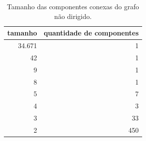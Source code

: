 \begin{table}[htbp]
\centering
\small
\caption{Tamanho das componentes conexas do grafo não dirigido.}
\label{tab:03_tamanho_componentes}
\begin{tabular}{rr}
\toprule
tamanho & quantidade de componentes \\
\midrule
34.671 & 1 \\
42 & 1 \\
9 & 1 \\
8 & 1 \\
5 & 7 \\
4 & 3 \\
3 & 33 \\
2 & 450 \\
\bottomrule
\end{tabular}
\end{table}
